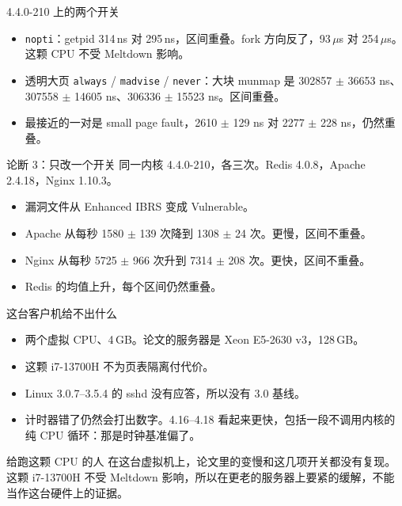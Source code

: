 \documentclass[aspectratio=169,fontset=none]{ctexbeamer}
\begin{document}
\begin{frame}{4.4.0-210 上的两个开关}
\begin{itemize}
\item \texttt{nopti}：getpid 314\,ns 对 295\,ns，区间重叠。fork 方向反了，93\,$\mu$s 对 254\,$\mu$s。这颗 CPU 不受 Meltdown 影响。
\item 透明大页 \texttt{always} / \texttt{madvise} / \texttt{never}：大块 munmap 是 302857 $\pm$ 36653 ns、307558 $\pm$ 14605 ns、306336 $\pm$ 15523 ns。区间重叠。
\item 最接近的一对是 small page fault，2610 $\pm$ 129 ns 对 2277 $\pm$ 228 ns，仍然重叠。
\end{itemize}
\end{frame}

\begin{frame}{论断 3：只改一个开关}
同一内核 4.4.0-210，各三次。Redis 4.0.8，Apache 2.4.18，Nginx 1.10.3。
\begin{itemize}
\item 漏洞文件从 Enhanced IBRS 变成 Vulnerable。
\item Apache 从每秒 1580 $\pm$ 139 次降到 1308 $\pm$ 24 次。更慢，区间不重叠。
\item Nginx 从每秒 5725 $\pm$ 966 次升到 7314 $\pm$ 208 次。更快，区间不重叠。
\item Redis 的均值上升，每个区间仍然重叠。
\end{itemize}
\end{frame}

\begin{frame}{这台客户机给不出什么}
\begin{itemize}
\item 两个虚拟 CPU、4\,GB。论文的服务器是 Xeon E5-2630 v3，128\,GB。
\item 这颗 i7-13700H 不为页表隔离付代价。
\item Linux 3.0.7--3.5.4 的 sshd 没有应答，所以没有 3.0 基线。
\item 计时器错了仍然会打出数字。4.16--4.18 看起来更快，包括一段不调用内核的纯 CPU 循环：那是时钟基准偏了。
\end{itemize}
\end{frame}

\begin{frame}{给跑这颗 CPU 的人}
在这台虚拟机上，论文里的变慢和这几项开关都没有复现。这颗 i7-13700H 不受 Meltdown 影响，所以在更老的服务器上要紧的缓解，不能当作这台硬件上的证据。
\end{frame}
\end{document}
